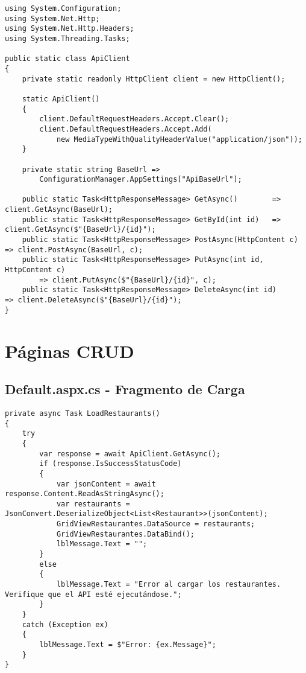 \documentclass[12pt,a4paper]{report}
\begin{document}
\begin{lstlisting}[language={[Sharp]C}]
using System.Configuration;
using System.Net.Http;
using System.Net.Http.Headers;
using System.Threading.Tasks;

public static class ApiClient
{
    private static readonly HttpClient client = new HttpClient();

    static ApiClient()
    {
        client.DefaultRequestHeaders.Accept.Clear();
        client.DefaultRequestHeaders.Accept.Add(
            new MediaTypeWithQualityHeaderValue("application/json"));
    }

    private static string BaseUrl =>
        ConfigurationManager.AppSettings["ApiBaseUrl"];

    public static Task<HttpResponseMessage> GetAsync()        => client.GetAsync(BaseUrl);
    public static Task<HttpResponseMessage> GetById(int id)   => client.GetAsync($"{BaseUrl}/{id}");
    public static Task<HttpResponseMessage> PostAsync(HttpContent c)  => client.PostAsync(BaseUrl, c);
    public static Task<HttpResponseMessage> PutAsync(int id, HttpContent c)
        => client.PutAsync($"{BaseUrl}/{id}", c);
    public static Task<HttpResponseMessage> DeleteAsync(int id)        => client.DeleteAsync($"{BaseUrl}/{id}");
}
\end{lstlisting}

\section{Páginas CRUD}

\subsection{Default.aspx.cs - Fragmento de Carga}

\begin{lstlisting}[language={[Sharp]C}]
private async Task LoadRestaurants()
{
    try
    {
        var response = await ApiClient.GetAsync();
        if (response.IsSuccessStatusCode)
        {
            var jsonContent = await response.Content.ReadAsStringAsync();
            var restaurants = JsonConvert.DeserializeObject<List<Restaurant>>(jsonContent);
            GridViewRestaurantes.DataSource = restaurants;
            GridViewRestaurantes.DataBind();
            lblMessage.Text = "";
        }
        else
        {
            lblMessage.Text = "Error al cargar los restaurantes. Verifique que el API esté ejecutándose.";
        }
    }
    catch (Exception ex)
    {
        lblMessage.Text = $"Error: {ex.Message}";
    }
}
\end{lstlisting}
\end{document}
